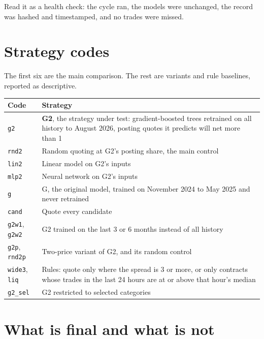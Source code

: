\documentclass[11pt,a4paper]{article}
\newcommand{\job}[1]{\texttt{#1}}
\newcommand{\cent}{\textcent}
\begin{document}
Read it as a health check: the cycle ran, the models were unchanged, the record was hashed and timestamped, and no
trades were missed.

\section*{Strategy codes}

The first six are the main comparison. The rest are variants and rule baselines, reported as descriptive.

{\small
\begin{tabularx}{\textwidth}{@{}P{3.2cm} L@{}}
\toprule
Code & Strategy \\
\midrule
\job{g2} & \textbf{G2}, the strategy under test: gradient-boosted trees retrained on all history to August 2026, posting
  quotes it predicts will net more than 1\cent \\
\job{rnd2} & Random quoting at G2's posting share, the main control \\
\job{lin2} & Linear model on G2's inputs \\
\job{mlp2} & Neural network on G2's inputs \\
\job{g} & G, the original model, trained on November 2024 to May 2025 and never retrained \\
\job{cand} & Quote every candidate \\
\midrule
\job{g2w1}, \job{g2w2} & G2 trained on the last 3 or 6 months instead of all history \\
\job{g2p}, \job{rnd2p} & Two-price variant of G2, and its random control \\
\job{wide3}, \job{liq} & Rules: quote only where the spread is 3\cent{} or more, or only contracts whose trades in
  the last 24 hours are at or above that hour's median \\
\job{g2\_sel} & G2 restricted to selected categories \\
\bottomrule
\end{tabularx}
}

\section*{What is final and what is not}
\end{document}
